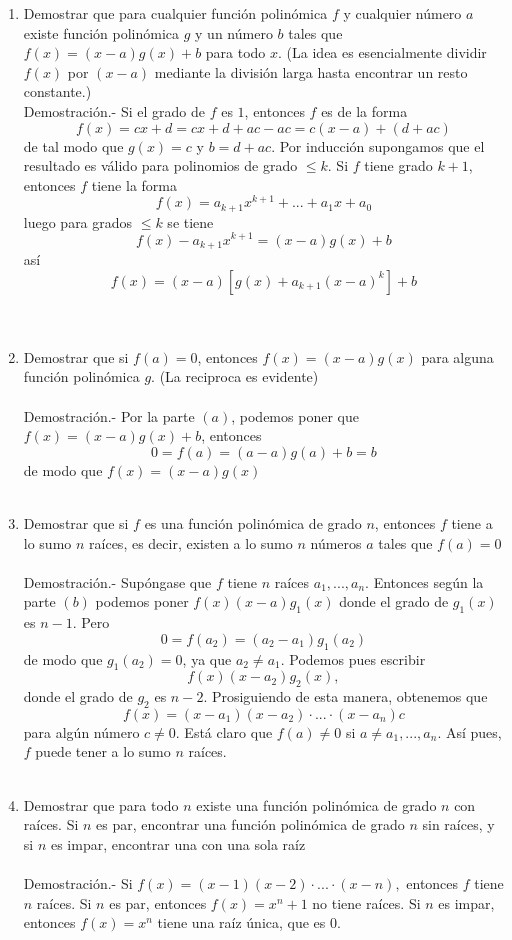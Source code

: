 \begin{enumerate}
\begin{enumerate}[\bfseries (a)]
	    \item Demostrar que para cualquier función polinómica $f$ y cualquier número $a$ existe función polinómica $g$ y un número $b$ tales que $f(x)=(x-a)g(x)+b$ para todo $x$. (La idea es esencialmente dividir $f(x)$ por $(x-a)$ mediante la división larga hasta encontrar un resto constante.)\\
	    Demostración.- \; Si el grado de $f$ es $1$, entonces $f$ es de la forma $$f(x)=cx+d=cx+d +ac-ac=c(x-a)+(d+ac)$$ de tal modo que $g(x)=c$ y $b=d+ac$. Por inducción supongamos que el resultado es válido para polinomios de grado $\leq k.$ Si $f$ tiene grado $k+1$, entonces $f$ tiene la forma $$f(x)=a_{k+1}x^{k+1} + ... + a_1x + a_0$$ luego para grados $\leq k$ se tiene $$f(x)-a_{k+1}x^{k+1} =(x-a)g(x)+b$$ así $$f(x) = (x-a)\left[g(x) + a_{k+1}(x-a)^k\right]+b$$\\\\

	    \item Demostrar que si $f(a)=0$, entonces $f(x)=(x-a)g(x)$ para alguna función polinómica $g$. (La reciproca es evidente)\\\\
	    Demostración.- \; Por la parte $(a)$, podemos poner que $f(x)=(x-a)g(x)+b$, entonces $$0=f(a)=(a-a)g(a)+b=b$$ de modo que $f(x)=(x-a)g(x)$\\\\

	    \item Demostrar que si $f$ es una función polinómica de grado $n$, entonces $f$ tiene a lo sumo $n$ raíces, es decir, existen a lo sumo $n$ números $a$ tales que $f(a)=0$\\\\
	    Demostración.- \; Supóngase que $f$ tiene $n$ raíces $a_1,...,a_n$. Entonces según la parte $(b)$ podemos poner $f(x)(x-a)g_1(x)$ donde el grado de $g_1(x)$ es $n-1$. Pero $$0=f(a_2)=(a_2-a_1)g_1(a_2)$$ de modo que $g_1(a_2)=0$, ya que $a_2 \neq a_1$. Podemos pues escribir $$f(x)(x-a_2)g_2(x),$$ donde el grado de $g_2$ es $n-2$. Prosiguiendo de esta manera, obtenemos que $$f(x)=(x-a_1)(x-a_2)\cdot ... \cdot (x-a_n)c$$ para algún número $c \neq 0.$ Está claro que $f(a)\neq 0$ si $a \neq a_1,...,a_n.$ Así pues, $f$ puede tener a lo sumo $n$ raíces.\\\\

	    \item Demostrar que para todo $n$ existe una función polinómica de grado $n$ con raíces. Si $n$ es par, encontrar una función polinómica de grado $n$ sin raíces, y si $n$ es impar, encontrar una con una sola raíz\\\\
	    Demostración.- \; Si $f(x)=(x-1)(x-2)\cdot ... \cdot (x-n),$ entonces $f$ tiene $n$ raíces. Si $n$ es par, entonces $f(x)=x^n + 1$ no tiene raíces. Si $n$ es impar, entonces $f(x)=x^n$ tiene una raíz única, que es $0.$\\\\


\end{enumerate}
\end{enumerate}
